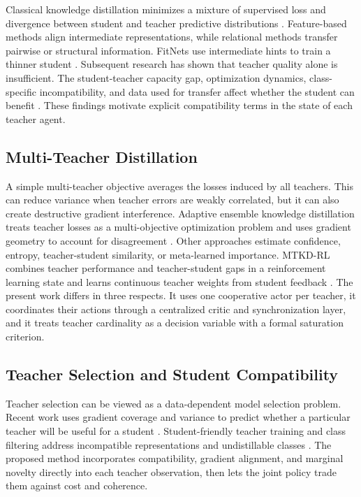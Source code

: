\documentclass[10pt,twocolumn,a4paper]{article}
\begin{document}
Classical knowledge distillation minimizes a mixture of supervised loss and divergence between student and teacher predictive distributions \cite{hinton2015}. Feature-based methods align intermediate representations, while relational methods transfer pairwise or structural information. FitNets use intermediate hints to train a thinner student \cite{romero2015}. Subsequent research has shown that teacher quality alone is insufficient. The student-teacher capacity gap, optimization dynamics, class-specific incompatibility, and data used for transfer affect whether the student can benefit \cite{cho2019,stanton2021,zhu2022,park2021}. These findings motivate explicit compatibility terms in the state of each teacher agent.

\subsection{Multi-Teacher Distillation}

A simple multi-teacher objective averages the losses induced by all teachers. This can reduce variance when teacher errors are weakly correlated, but it can also create destructive gradient interference. Adaptive ensemble knowledge distillation treats teacher losses as a multi-objective optimization problem and uses gradient geometry to account for disagreement \cite{du2020}. Other approaches estimate confidence, entropy, teacher-student similarity, or meta-learned importance. MTKD-RL combines teacher performance and teacher-student gaps in a reinforcement learning state and learns continuous teacher weights from student feedback \cite{yang2025}. The present work differs in three respects. It uses one cooperative actor per teacher, it coordinates their actions through a centralized critic and synchronization layer, and it treats teacher cardinality as a decision variable with a formal saturation criterion.

\subsection{Teacher Selection and Student Compatibility}

Teacher selection can be viewed as a data-dependent model selection problem. Recent work uses gradient coverage and variance to predict whether a particular teacher will be useful for a student \cite{panigrahi2026}. Student-friendly teacher training and class filtering address incompatible representations and undistillable classes \cite{park2021,zhu2022}. The proposed method incorporates compatibility, gradient alignment, and marginal novelty directly into each teacher observation, then lets the joint policy trade them against cost and coherence.
\end{document}
